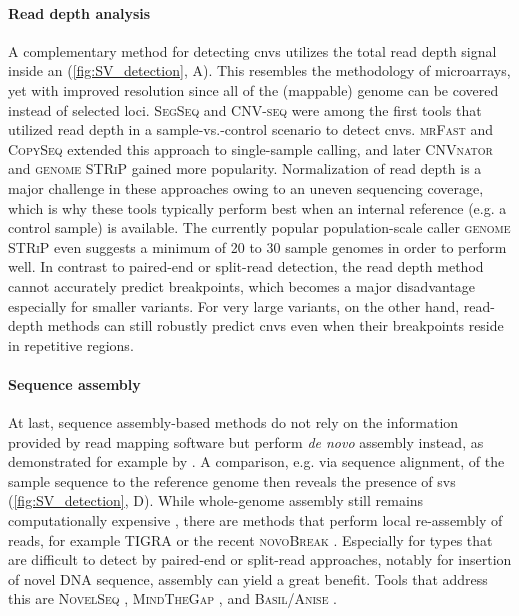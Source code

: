 \paragraph{Read depth analysis}
A complementary method for detecting \acp{cnv} utilizes the total read depth
signal inside an \sv  (\cref{fig:SV_detection}, A). This resembles the
methodology of microarrays, yet with
improved resolution since all of the (mappable) genome can be covered instead
of selected loci. \textsc{SegSeq} \citep{Chiang2009} and \textsc{CNV-seq}
\citep{Xie2009} were among the first tools that utilized read depth in a
sample-vs.-control scenario to detect \acp{cnv}. \textsc{mrFast}
\citep{Alkan2009} and \textsc{CopySeq} \citep{Waszak2010} extended this
approach to single-sample \cnv calling, and later \textsc{CNVnator}
\citep{Abyzov2011} and \textsc{genome STRiP} \citep{Handsaker2015} gained more
popularity. Normalization of read depth is a major challenge in these approaches
owing to an uneven sequencing coverage, which is why these tools typically
perform best when an internal reference (e.g. a control sample) is available.
The currently popular population-scale \cnv caller \textsc{genome STRiP} even
suggests a minimum of 20 to 30 sample genomes in order to perform well. In
contrast to paired-end or split-read detection, the read depth method cannot
accurately predict breakpoints, which becomes a major disadvantage especially
for smaller variants. For very large variants, on the other hand, read-depth
methods can still robustly predict \acp{cnv} even when their breakpoints reside
in repetitive regions.

\paragraph{Sequence assembly} At last, sequence assembly-based methods do not rely on the
information provided by read mapping software but perform \textit{de novo}
assembly instead, as demonstrated for example by \citep{Li2011a}. A comparison,
e.g. via sequence alignment, of the sample sequence to the reference genome then
reveals the presence of \acp{sv}  (\cref{fig:SV_detection}, D).
While whole-genome assembly still remains computationally expensive
\citep{Bradnam2013}, there are methods that perform local re-assembly of reads,
for example \textsc{TIGRA} \citep{Chen2014b} or the recent \textsc{novoBreak}
\citep{Chong2017}. Especially for \sv types that are difficult to detect by
paired-end or split-read approaches, notably for insertion of novel DNA sequence,
assembly can yield a great benefit. Tools that address this are \textsc{NovelSeq}
\citep{Hajirasouliha2010}, \textsc{MindTheGap} \citep{Rizk2014}, and
\textsc{Basil/Anise} \citep{Holtgrewe2015}.

